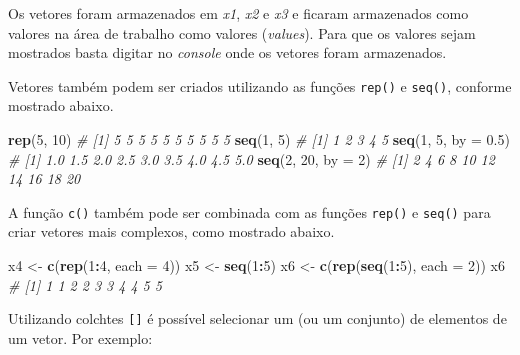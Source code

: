 \documentclass[
]{book}
\newenvironment{Shaded}{\begin{snugshade}}{\end{snugshade}}
\newcommand{\CommentTok}[1]{\textcolor[rgb]{0.56,0.35,0.01}{\textit{#1}}}
\newcommand{\DataTypeTok}[1]{\textcolor[rgb]{0.13,0.29,0.53}{#1}}
\newcommand{\DecValTok}[1]{\textcolor[rgb]{0.00,0.00,0.81}{#1}}
\newcommand{\FloatTok}[1]{\textcolor[rgb]{0.00,0.00,0.81}{#1}}
\newcommand{\KeywordTok}[1]{\textcolor[rgb]{0.13,0.29,0.53}{\textbf{#1}}}
\newcommand{\NormalTok}[1]{#1}
\newcommand{\OperatorTok}[1]{\textcolor[rgb]{0.81,0.36,0.00}{\textbf{#1}}}
\newcommand{\StringTok}[1]{\textcolor[rgb]{0.31,0.60,0.02}{#1}}
\begin{document}
Os vetores foram armazenados em \emph{x1}, \emph{x2} e \emph{x3} e ficaram armazenados como valores na área de trabalho como valores (\emph{values}). Para que os valores sejam mostrados basta digitar no \emph{console} onde os vetores foram armazenados.

Vetores também podem ser criados utilizando as funções \texttt{rep()} e \texttt{seq()}, conforme mostrado abaixo.  

\begin{Shaded}
\begin{Highlighting}[]
\KeywordTok{rep}\NormalTok{(}\DecValTok{5}\NormalTok{, }\DecValTok{10}\NormalTok{)}
\CommentTok{#  [1] 5 5 5 5 5 5 5 5 5 5}
\KeywordTok{seq}\NormalTok{(}\DecValTok{1}\NormalTok{, }\DecValTok{5}\NormalTok{)}
\CommentTok{# [1] 1 2 3 4 5}
\KeywordTok{seq}\NormalTok{(}\DecValTok{1}\NormalTok{, }\DecValTok{5}\NormalTok{, }\DataTypeTok{by =} \FloatTok{0.5}\NormalTok{)}
\CommentTok{# [1] 1.0 1.5 2.0 2.5 3.0 3.5 4.0 4.5 5.0}
\KeywordTok{seq}\NormalTok{(}\DecValTok{2}\NormalTok{, }\DecValTok{20}\NormalTok{, }\DataTypeTok{by =} \DecValTok{2}\NormalTok{)}
\CommentTok{#  [1]  2  4  6  8 10 12 14 16 18 20}
\end{Highlighting}
\end{Shaded}

A função \texttt{c()} também pode ser combinada com as funções \texttt{rep()} e \texttt{seq()} para criar vetores mais complexos, como mostrado abaixo.

\begin{Shaded}
\begin{Highlighting}[]
\NormalTok{x4 <-}\StringTok{ }\KeywordTok{c}\NormalTok{(}\KeywordTok{rep}\NormalTok{(}\DecValTok{1}\OperatorTok{:}\DecValTok{4}\NormalTok{, }\DataTypeTok{each =} \DecValTok{4}\NormalTok{))}
\NormalTok{x5 <-}\StringTok{ }\KeywordTok{seq}\NormalTok{(}\DecValTok{1}\OperatorTok{:}\DecValTok{5}\NormalTok{)}
\NormalTok{x6 <-}\StringTok{ }\KeywordTok{c}\NormalTok{(}\KeywordTok{rep}\NormalTok{(}\KeywordTok{seq}\NormalTok{(}\DecValTok{1}\OperatorTok{:}\DecValTok{5}\NormalTok{), }\DataTypeTok{each =} \DecValTok{2}\NormalTok{))}
\NormalTok{x6}
\CommentTok{#  [1] 1 1 2 2 3 3 4 4 5 5}
\end{Highlighting}
\end{Shaded}

Utilizando colchtes \texttt{{[}{]}} é possível selecionar um (ou um conjunto) de elementos de um vetor. Por exemplo:
\end{document}
